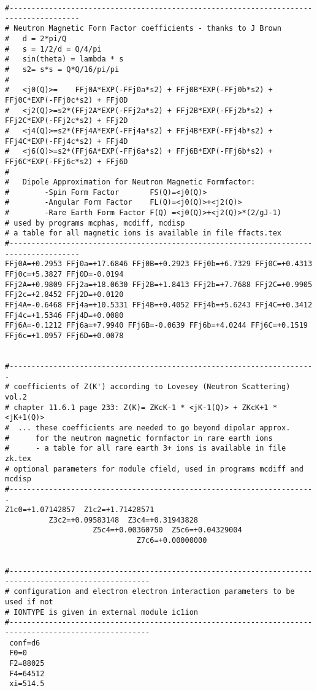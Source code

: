 \begin{verbatim}
#--------------------------------------------------------------------------------------
# Neutron Magnetic Form Factor coefficients - thanks to J Brown
#   d = 2*pi/Q      
#   s = 1/2/d = Q/4/pi   
#   sin(theta) = lambda * s
#   s2= s*s = Q*Q/16/pi/pi
#
#   <j0(Q)>=    FFj0A*EXP(-FFj0a*s2) + FFj0B*EXP(-FFj0b*s2) + FFj0C*EXP(-FFj0c*s2) + FFj0D
#   <j2(Q)>=s2*(FFj2A*EXP(-FFj2a*s2) + FFj2B*EXP(-FFj2b*s2) + FFj2C*EXP(-FFj2c*s2) + FFj2D
#   <j4(Q)>=s2*(FFj4A*EXP(-FFj4a*s2) + FFj4B*EXP(-FFj4b*s2) + FFj4C*EXP(-FFj4c*s2) + FFj4D
#   <j6(Q)>=s2*(FFj6A*EXP(-FFj6a*s2) + FFj6B*EXP(-FFj6b*s2) + FFj6C*EXP(-FFj6c*s2) + FFj6D
#
#   Dipole Approximation for Neutron Magnetic Formfactor:
#        -Spin Form Factor       FS(Q)=<j0(Q)>
#        -Angular Form Factor    FL(Q)=<j0(Q)>+<j2(Q)>
#        -Rare Earth Form Factor F(Q) =<j0(Q)>+<j2(Q)>*(2/gJ-1)
# used by programs mcphas, mcdiff, mcdisp
# a table for all magnetic ions is available in file ffacts.tex
#--------------------------------------------------------------------------------------
FFj0A=+0.2953 FFj0a=+17.6846 FFj0B=+0.2923 FFj0b=+6.7329 FFj0C=+0.4313 FFj0c=+5.3827 FFj0D=-0.0194
FFj2A=+0.9809 FFj2a=+18.0630 FFj2B=+1.8413 FFj2b=+7.7688 FFj2C=+0.9905 FFj2c=+2.8452 FFj2D=+0.0120
FFj4A=-0.6468 FFj4a=+10.5331 FFj4B=+0.4052 FFj4b=+5.6243 FFj4C=+0.3412 FFj4c=+1.5346 FFj4D=+0.0080
FFj6A=-0.1212 FFj6a=+7.9940 FFj6B=-0.0639 FFj6b=+4.0244 FFj6C=+0.1519 FFj6c=+1.0957 FFj6D=+0.0078


#----------------------------------------------------------------------
# coefficients of Z(K') according to Lovesey (Neutron Scattering) vol.2
# chapter 11.6.1 page 233: Z(K)= ZKcK-1 * <jK-1(Q)> + ZKcK+1 * <jK+1(Q)>
#  ... these coefficients are needed to go beyond dipolar approx.
#      for the neutron magnetic formfactor in rare earth ions
#      - a table for all rare earth 3+ ions is available in file zk.tex
# optional parameters for module cfield, used in programs mcdiff and mcdisp
#----------------------------------------------------------------------
Z1c0=+1.07142857  Z1c2=+1.71428571
		  Z3c2=+0.09583148  Z3c4=+0.31943828
				    Z5c4=+0.00360750  Z5c6=+0.04329004
						      Z7c6=+0.00000000


#------------------------------------------------------------------------------------------------------
# configuration and electron electron interaction parameters to be used if not
# IONTYPE is given in external module ic1ion
#------------------------------------------------------------------------------------------------------
 conf=d6
 F0=0
 F2=88025
 F4=64512
 xi=514.5


\end{verbatim}
